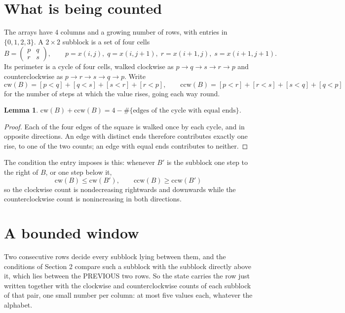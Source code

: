 \documentclass[11pt,a4paper]{article}
\theoremstyle{plain}
\newtheorem{lemma}[theorem]{Lemma}
\theoremstyle{definition}
\begin{document}
\section{What is being counted}

The arrays have $4$ columns and a growing number of rows, with entries in $\{0,1,2,3\}$. A
$2\times2$ subblock is a set of four cells
\[
B=\begin{pmatrix} p & q \\ r & s \end{pmatrix},
\qquad p=x(i,j),\; q=x(i,j+1),\; r=x(i+1,j),\; s=x(i+1,j+1).
\]
Its perimeter is a cycle of four cells, walked clockwise as $p\to q\to s\to r\to p$ and
counterclockwise as $p\to r\to s\to q\to p$. Write
\[
\mathrm{cw}(B)=[p<q]+[q<s]+[s<r]+[r<p],\qquad
\mathrm{ccw}(B)=[p<r]+[r<s]+[s<q]+[q<p]
\]
for the number of steps at which the value rises, going each way round.

\begin{lemma}\label{lem:sum}
$\mathrm{cw}(B)+\mathrm{ccw}(B)=4-\#\{\text{edges of the cycle with equal ends}\}$.
\end{lemma}

\begin{proof}
Each of the four edges of the square is walked once by each cycle, and in opposite directions.
An edge with distinct ends therefore contributes exactly one rise, to one of the two counts;
an edge with equal ends contributes to neither.
\end{proof}

The condition the entry imposes is this: whenever $B'$ is the subblock one step to the right of $B$, or one step below it, 
\[
\mathrm{cw}(B)\le\mathrm{cw}(B'),\qquad \mathrm{ccw}(B)\ge\mathrm{ccw}(B')
\]
so the clockwise count is nondecreasing rightwards and downwards while the counterclockwise count is nonincreasing in both directions.

\section{A bounded window}

Two consecutive rows decide every subblock lying between them, and the conditions of Section 2 compare such a subblock with the subblock directly above it, which lies between the PREVIOUS two rows. So the state carries the row just written together with the clockwise and counterclockwise counts of each subblock of that pair, one small number per column: at most five values each, whatever the alphabet.
\end{document}
